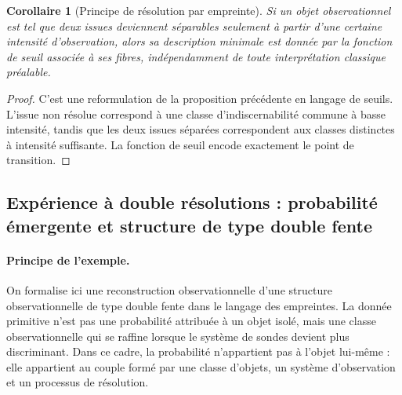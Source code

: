 \documentclass[11pt,a4paper,openany]{book}
\newtheorem{corollary}[definition]{Corollaire}
\begin{document}
\begin{corollary}[Principe de résolution par empreinte]
Si un objet observationnel est tel que deux issues deviennent séparables seulement à partir d'une certaine intensité d'observation, alors sa description minimale est donnée par la fonction de seuil associée à ses fibres, indépendamment de toute interprétation classique préalable.
\end{corollary}

\begin{proof}
C'est une reformulation de la proposition précédente en langage de seuils. L'issue non résolue correspond à une classe d'indiscernabilité commune à basse intensité, tandis que les deux issues séparées correspondent aux classes distinctes à intensité suffisante. La fonction de seuil encode exactement le point de transition.
\end{proof}

%














%


\subsection*{Expérience à double résolutions : probabilité émergente et structure de type double fente}

\paragraph{Principe de l'exemple.}
On formalise ici une reconstruction observationnelle d'une structure observationnelle de type double fente dans le langage des empreintes. La donnée primitive n'est pas une probabilité attribuée à un objet isolé, mais une classe observationnelle qui se raffine lorsque le système de sondes devient plus discriminant. Dans ce cadre, la probabilité n'appartient pas à l'objet lui-même : elle appartient au couple formé par une classe d'objets, un système d'observation et un processus de résolution.
\end{document}
